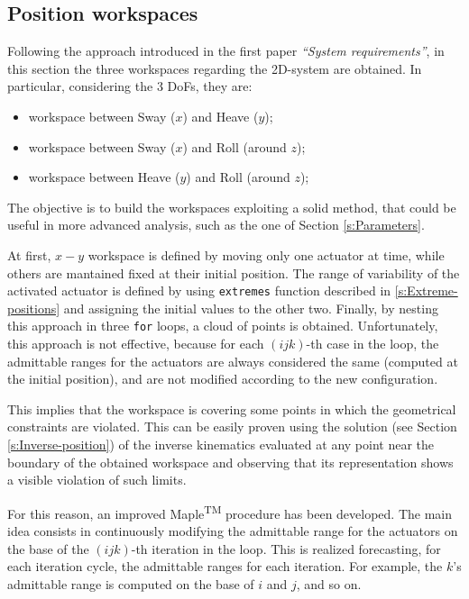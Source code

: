 \documentclass[10.5pt, twocolumn]{article}
\newcommand{\Virgolette}[1]{``#1''}
\begin{document}
\subsection{Position workspaces}
\label{s:Position-workspaces}
Following the approach introduced in the first paper \textit{\Virgolette{System requirements}}, in this section the three workspaces regarding the 2D-system are obtained. In particular, considering the 3 DoFs, they are:
\begin{itemize}
  \item workspace between Sway (\( x \)) and Heave (\( y \));
  \item workspace between Sway (\( x \)) and Roll (around \( z \));
  \item workspace between Heave (\( y \)) and Roll (around \( z \));
\end{itemize}

The objective is to build the workspaces exploiting a solid method, that could be useful in more advanced analysis, such as the one of Section \ref{s:Parameters}.

At first, \( x-y\) workspace is defined by moving only one actuator at time, while others are mantained fixed at their initial position. The range of variability of the activated actuator is defined by using \texttt{extremes} function described in \ref{s:Extreme-positions} and assigning the initial values to the other two.
Finally, by nesting this approach in three \texttt{for} loops, a cloud of points is obtained. Unfortunately, this approach is not effective, because for each \( (i j k) \)-th case in the loop, the admittable ranges for the actuators are always considered the same (computed at the initial position), and are not modified according to the new configuration.

This implies that the workspace is covering some points in which the geometrical constraints are violated. This can be easily proven using the solution (see Section \ref{s:Inverse-position}) of the inverse kinematics evaluated at any point near the boundary of the obtained workspace and observing that its representation shows a visible violation of such limits.

For this reason, an improved Maple\textsuperscript{TM} procedure has been developed. The main idea consists in continuously modifying the admittable range for the actuators on the base of the \( (i j k) \)-th iteration in the loop. This is realized forecasting, for each iteration cycle, the admittable ranges for each iteration. For example, the \( k \)'s admittable range is computed on the base of \( i \) and \( j \), and so on.
\end{document}
